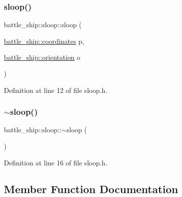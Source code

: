 \mbox{\label{classbattle__ship_1_1sloop_a3cf36ea46d4623283e9156683753df18}} 
\subsubsection{\texorpdfstring{sloop()}{sloop()}\hspace{0.1cm}{\footnotesize\ttfamily [2/2]}}
{\footnotesize\ttfamily battle\+\_\+ship\+::sloop\+::sloop (\begin{DoxyParamCaption}\item[{\hyperlink{structbattle__ship_1_1coordinates}{battle\+\_\+ship\+::coordinates}}]{p,  }\item[{\hyperlink{namespacebattle__ship_aed87488f0a73f0d0679fe343fb61c784}{battle\+\_\+ship\+::orientation}}]{o }\end{DoxyParamCaption})\hspace{0.3cm}{\ttfamily [inline]}}



Definition at line 12 of file sloop.\+h.

\mbox{\label{classbattle__ship_1_1sloop_a576cf3dbf2293c70e745ab561eae01c4}} 
\subsubsection{\texorpdfstring{$\sim$sloop()}{~sloop()}}
{\footnotesize\ttfamily battle\+\_\+ship\+::sloop\+::$\sim$sloop (\begin{DoxyParamCaption}{ }\end{DoxyParamCaption})\hspace{0.3cm}{\ttfamily [inline]}}



Definition at line 16 of file sloop.\+h.



\subsection{Member Function Documentation}
\mbox{\label{classbattle__ship_1_1sloop_a4448d666d4d7a4524618ad88e4dc802e}} 
